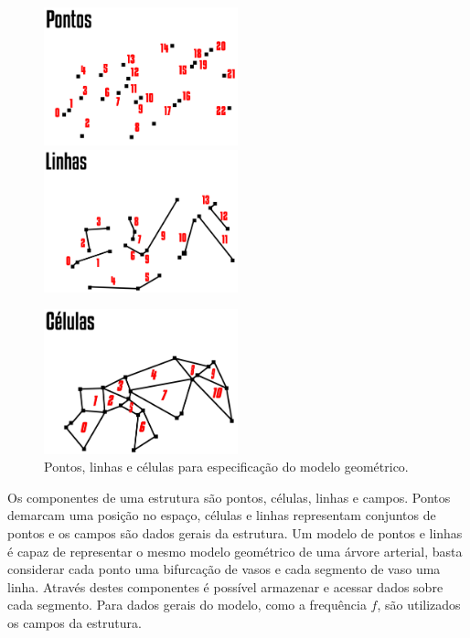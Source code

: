 \begin{figure}[!htbp]
	\includegraphics[width=0.5\textwidth]{Figures/WiseElementPoints@16x.png}
	\includegraphics[width=0.5\textwidth]{Figures/WiseElementLines@16x.png}
	
	\includegraphics[width=0.5\textwidth]{Figures/WiseElementCells@16x.png}
	\caption{Pontos, linhas e células para especificação do modelo geométrico.}
	\label{fig2:wiselementstructs}
\end{figure}

Os componentes de uma estrutura são pontos, células, linhas e campos. Pontos demarcam uma posição no espaço, células e linhas representam conjuntos de pontos e os campos são dados gerais da estrutura. Um modelo de pontos e linhas é capaz de representar o mesmo modelo geométrico de uma árvore arterial, basta considerar cada ponto uma bifurcação de vasos e cada segmento de vaso uma linha. Através destes componentes é possível armazenar e acessar dados sobre cada segmento. Para dados gerais do modelo, como a frequência $f$, são utilizados os campos da estrutura.

